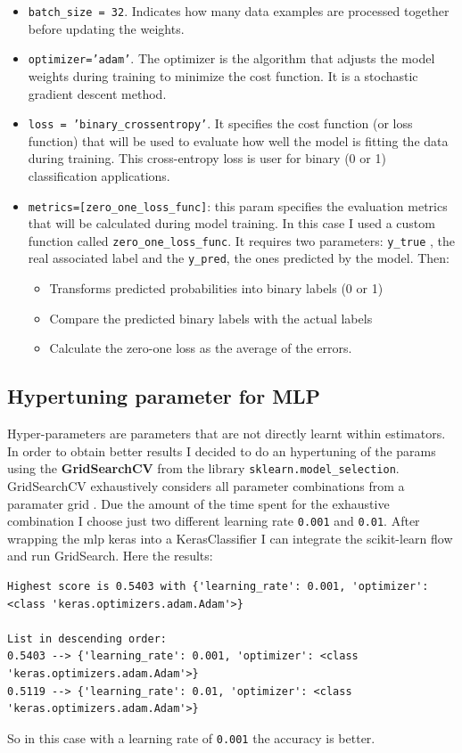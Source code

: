 \begin{itemize}
\item \texttt{batch\_size =  32}. Indicates how many data examples are processed together before updating the weights.
\item \texttt{optimizer='adam'}. The optimizer is the algorithm that adjusts the model weights during training to minimize the cost function. It is a stochastic gradient descent method.
\item \texttt{loss = 'binary\_crossentropy'}. It specifies the cost function (or loss function) that will be used to evaluate how well the model is fitting the data during training. This cross-entropy loss is user for binary (0 or 1) classification applications.
\item \texttt{metrics=[zero\_one\_loss\_func]}: this param specifies the evaluation metrics that will be calculated during model training. In this case I used a custom function called \texttt{zero\_one\_loss\_func}. It requires two parameters: \texttt{y\_true} , the real associated label and the \texttt{y\_pred}, the ones predicted by the model. Then:
\begin{itemize}
\item Transforms predicted probabilities into binary labels (0 or 1)
\item Compare the predicted binary labels with the actual labels
\item Calculate the zero-one loss as the average of the errors.
\end{itemize}
\end{itemize}
\subsection{Hypertuning parameter for MLP}
Hyper-parameters are parameters that are not directly learnt within estimators.
In order to obtain better results I decided to do an hypertuning of the params using the \textbf{GridSearchCV} from the library \texttt{sklearn.model\_selection}.  GridSearchCV exhaustively considers all parameter combinations from a paramater grid \cite{scikitgs}.
Due the amount of the time spent for the exhaustive combination I choose just two different learning rate \texttt{0.001} and  \texttt{0.01}.
After wrapping the mlp keras into a KerasClassifier I can integrate the scikit-learn flow and run GridSearch. Here the results:
\begin{lstlisting}
Highest score is 0.5403 with {'learning_rate': 0.001, 'optimizer': <class 'keras.optimizers.adam.Adam'>} 

List in descending order:
0.5403 --> {'learning_rate': 0.001, 'optimizer': <class 'keras.optimizers.adam.Adam'>} 
0.5119 --> {'learning_rate': 0.01, 'optimizer': <class 'keras.optimizers.adam.Adam'>} 
\end{lstlisting}
So in this case with a learning rate of \texttt{0.001} the accuracy is better.
